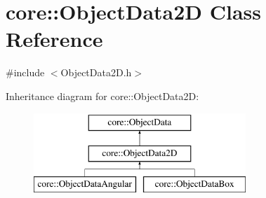 \hypertarget{classcore_1_1ObjectData2D}{}\section{core\+:\+:Object\+Data2D Class Reference}
\label{classcore_1_1ObjectData2D}


{\ttfamily \#include $<$Object\+Data2\+D.\+h$>$}

Inheritance diagram for core\+:\+:Object\+Data2D\+:\begin{figure}[H]
\begin{center}
\leavevmode
\includegraphics[height=3.000000cm]{classcore_1_1ObjectData2D}
\end{center}
\end{figure}
